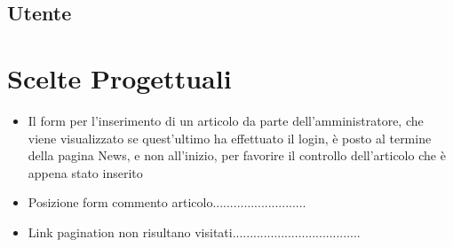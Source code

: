 \documentclass[10pt, a4paper]{article}
\begin{document}
\subsection{Utente}

\section{Scelte Progettuali}
\begin{itemize}
	\item{Il form per l'inserimento di un articolo da parte dell'amministratore, che viene visualizzato se quest'ultimo ha effettuato il login, è posto al termine della pagina News, e non all'inizio, per favorire il controllo dell'articolo che è appena stato inserito}
	\item{Posizione form commento articolo...........................}
	\item{Link pagination non risultano visitati.....................................}
\end{itemize}
\end{document}
